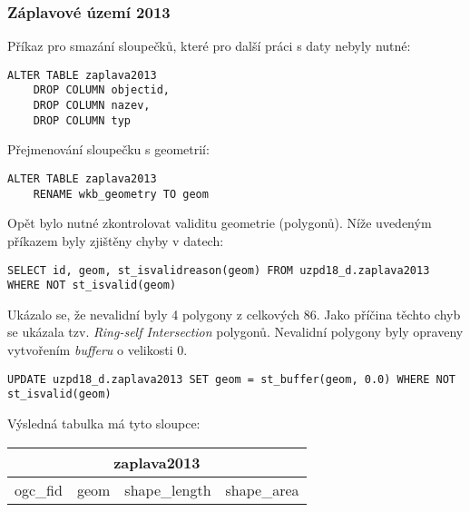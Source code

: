 \documentclass[a4paper, 12pt]{article}
\begin{document}
\subsubsection*{Záplavové území 2013}
Příkaz pro smazání sloupečků, které pro další práci s daty nebyly nutné:
\begin{lstlisting}
ALTER TABLE zaplava2013
    DROP COLUMN objectid,
    DROP COLUMN nazev,
    DROP COLUMN typ
\end{lstlisting}
Přejmenování sloupečku s geometrií:
\begin{lstlisting}
ALTER TABLE zaplava2013
    RENAME wkb_geometry TO geom
\end{lstlisting} 
Opět bylo nutné zkontrolovat validitu geometrie (polygonů). Níže uvedeným příkazem byly zjištěny chyby v datech:
\begin{lstlisting}
SELECT id, geom, st_isvalidreason(geom) FROM uzpd18_d.zaplava2013 WHERE NOT st_isvalid(geom)
\end{lstlisting}
Ukázalo se, že nevalidní byly 4 polygony z celkových 86. Jako příčina těchto chyb se ukázala tzv. \textit{Ring-self Intersection} polygonů. Nevalidní polygony byly opraveny vytvoře\-ním \textit{bufferu} o velikosti 0. 
\begin{lstlisting}
UPDATE uzpd18_d.zaplava2013 SET geom = st_buffer(geom, 0.0) WHERE NOT st_isvalid(geom)
\end{lstlisting}
Výsledná tabulka má tyto sloupce:

\begin{table}[h!]
\centering
\begin{tabular}{|c|c|c|c|}
\hline
\multicolumn{4}{|c|}{\textbf{zaplava2013}}    \\ \hline
ogc\_fid & geom & shape\_length & shape\_area \\ \hline
\end{tabular}
\end{table}
\clearpage
\end{document}
